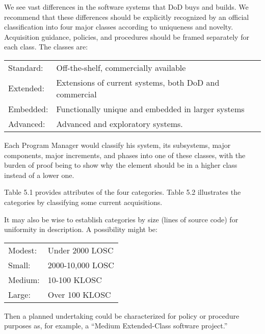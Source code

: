 \documentclass[12pt,final]{article}
\begin{document}
We see vast differences in the software systems that DoD buys and builds. We
recommend that these differences should be explicitly recognized by an official
classification into four major classes according to uniqueness and novelty.
Acquisition guidance, policies, and procedures should be framed separately for
each class. The classes are:

\begin{center}
    \begin{tabular}{ l l }
Standard: & Off-the-shelf, commercially available \\

Extended: & Extensions of current systems, both DoD and commercial \\

Embedded: & Functionally unique and embedded in larger systems \\

Advanced: & Advanced and exploratory systems. \\
    \end{tabular}
\end{center}

Each Program Manager would classify his system, its subsystems, major
components, major increments, and phases into one of these classes, with the
burden of proof being to show why the element should be in a higher class
instead of a lower one.

Table 5.1 provides attributes of the four categories. Table 5.2 illustrates the
categories by classifying some current acquisitions.

It may also be wise to establish categories by size (lines of source code) for
uniformity in description. A possibility might be:

\begin{center}
    \begin{tabular}{ l l }
Modest: & Under 2000 LOSC\\

Small: & 2000-10,000 LOSC\\

Medium: & 10-100 KLOSC\\

Large: & Over 100 KLOSC\\
    \end{tabular}
\end{center}

Then a planned undertaking could be characterized for policy or procedure purposes
as, for example, a “Medium Extended-Class software project.”
\end{document}
